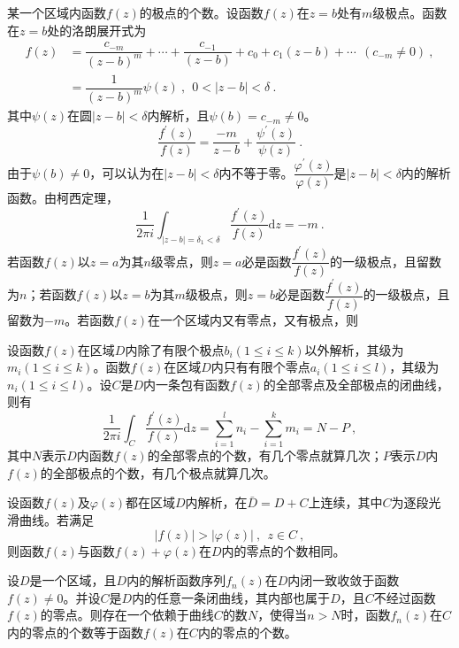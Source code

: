 \documentclass[12pt,a4paper]{article}
\newcommand{\dif}{\mathrm{d}}
\begin{document}
某一个区域内函数$f(z)$的极点的个数。设函数$f(z)$在$z=b$处有$m$级极点。函数在$z=b$处的洛朗展开式为
\begin{align*}
f(z) &= \dfrac{c_{-m}}{(z-b)^m} +\cdots +\dfrac{c_{-1}}{(z-b)} +c_0 +c_1 (z-b) + \cdots ~~ (c_{-m} \neq 0) ~, \\
&= \dfrac{1}{(z-b)^m} \psi(z) ~, ~~ 0 < |z-b| < \delta ~.
\end{align*}
其中$\psi(z)$在圆$|z-b| < \delta$内解析，且$\psi(b) = c_{-m} \neq 0$。
\begin{equation*}
\dfrac{f^\prime(z)}{f(z)} = \dfrac{-m}{z-b} + \dfrac{\psi^\prime(z)}{\psi(z)} ~.
\end{equation*}
由于$\psi(b) \neq 0$，可以认为在$|z-b| < \delta$内不等于零。$\dfrac{\varphi^\prime(z)}{\varphi(z)}$是$|z-b| < \delta$内的解析函数。由柯西定理，
\begin{equation*}
\dfrac{1}{2\pi i} \int_{|z-b| =\delta_1 < \delta} \dfrac{f^\prime(z)}{f(z)} \dif z= -m ~.
\end{equation*}
若函数$f(z)$以$z=a$为其$n$级零点，则$z=a$必是函数$\dfrac{f^\prime(z)}{f(z)}$的一级极点，且留数为$n$；若函数$f(z)$以$z=b$为其$m$级极点，则$z=b$必是函数$\dfrac{f^\prime(z)}{f(z)}$的一级极点，且留数为$-m$。若函数$f(z)$在一个区域内又有零点，又有极点，则
\begin{tcolorbox}[colback=green!5,colframe=green!40!black,title= 定理1]
设函数$f(z)$在区域$D$内除了有限个极点$b_i(1\leqslant i \leqslant k)$以外解析，其级为$m_i(1\leqslant i \leqslant k)$。函数$f(z)$在区域$D$内只有有限个零点$a_i(1\leqslant i \leqslant l)$，其级为$n_i(1\leqslant i \leqslant l)$。设$C$是$D$内一条包有函数$f(z)$的全部零点及全部极点的闭曲线，则有
\begin{equation}
\dfrac{1}{2\pi i} \int_C \dfrac{f^\prime(z)}{f(z)} \dif z = \sum_{i=1}^l n_i -\sum_{i=1}^k m_i = N -P ~,
\end{equation}
其中$N$表示$D$内函数$f(z)$的全部零点的个数，有几个零点就算几次；$P$表示$D$内$f(z)$的全部极点的个数，有几个极点就算几次。
\end{tcolorbox}




\begin{tcolorbox}[colback=green!5,colframe=green!40!black,title= 鲁歇(Rouche)定理]
设函数$f(z)$及$\varphi(z)$都在区域$D$内解析，在$\bar{D} = D +C$上连续，其中$C$为逐段光滑曲线。若满足
\begin{equation}
|f(z)| > |\varphi(z)| ~, ~~ z \in C ~,
\end{equation}
则函数$f(z)$与函数$f(z)+\varphi(z)$在$D$内的零点的个数相同。
\end{tcolorbox}



\begin{tcolorbox}[colback=green!5,colframe=green!40!black,title= 霍尔维茨(Hurwitz)定理]
设$D$是一个区域，且$D$内的解析函数序列$f_n(z)$在$D$内闭一致收敛于函数$f(z) \neq 0$。并设$C$是$D$内的任意一条闭曲线，其内部也属于$D$，且$C$不经过函数$f(z)$的零点。则存在一个依赖于曲线$C$的数$N$，使得当$n > N$时，函数$f_n(z)$在$C$内的零点的个数等于函数$f(z)$在$C$内的零点的个数。
\end{tcolorbox}
\end{document}
